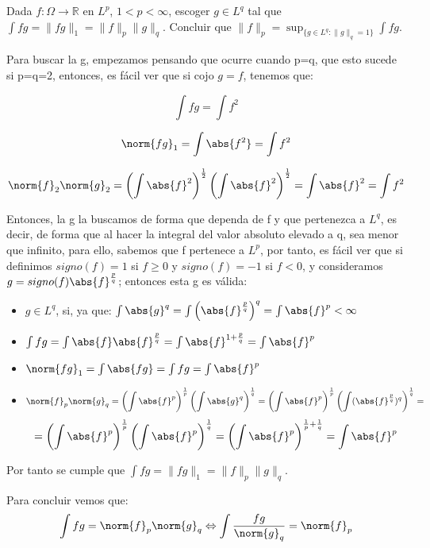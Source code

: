
\begin{problem}[4] Dada $f:\Omega\to \mathbb{R}$ en $L^p$,  $1 < p <  \infty$, escoger $g\in L^q$ tal que
$\int fg = \|fg\|_1 = \|f\|_p\|g\|_q$. Concluir que 
$\|f\|_p= \operatorname{sup}_{\{g\in L^q: \|g\|_q=1\}} \int fg $.
\solution

Para buscar la g, empezamos pensando que ocurre cuando p=q, que esto sucede si p=q=2, entonces, es fácil ver que si cojo $g=f$, tenemos que:

\[
\int fg = \int f^2
\]

\[
\norm{fg}_1 = \int \abs{f^2} = \int f^2
\]

\[
\norm{f}_2 \norm{g}_2 = \left( \int \abs{f}^2 \right)^{\frac{1}{2}} \left( \int \abs{f}^2 \right)^{\frac{1}{2}} =  \int \abs{f}^2 = \int f^2
\]

Entonces, la g la buscamos de forma que dependa de f y  que pertenezca a $L^q$, es decir, de forma que al hacer la integral del valor absoluto elevado a q, sea menor que infinito, para ello, sabemos que f pertenece a $L^p$, por tanto, es fácil ver que si definimos $signo(f)=1$ si $f\geq0$ y $signo(f)=-1$ si $f<0$, y consideramos $g=signo(f)\abs{f}^\frac{p}{q}$; entonces esta g es válida:

\begin{itemize}
\item $g \in L^q$, si, ya que: $\int \abs{g}^q = \int\left( \abs{f}^{\frac{p}{q}}\right)^q = \int \abs{f}^p < \infty$
\item $\int fg = \int \abs{f} \abs{f}^{\frac{p}{q}} = \int \abs{f}^{1+\frac{p}{q}} = \int \abs{f}^p$
\item $\norm{fg}_1 = \int \abs{fg} = \int fg = \int \abs{f}^p$
\item $$\norm{f}_p\norm{g}_q = \left( \int \abs{f}^p \right)^\frac{1}{p} \left( \int \abs{g}^q \right)^\frac{1}{q} = \left( \int \abs{f}^p \right)^\frac{1}{p} \left( \int (\abs{f}^\frac{p}{q})^q \right)^\frac{1}{q} = $$
$$= \left( \int \abs{f}^p \right)^\frac{1}{p} \left( \int \abs{f}^p \right)^\frac{1}{q} = \left( \int \abs{f}^{p}\right)^{\frac{1}{p}+\frac{1}{q}} = \int \abs{f}^p$$
\end{itemize}

Por tanto se cumple que $\int fg = \|fg\|_1 = \|f\|_p\|g\|_q$.

Para concluir vemos que:
\[
\int fg = \norm{f}_p \norm{g}_q  \Leftrightarrow \int \frac{fg}{\norm{g}_q} = \norm{f}_p 
\]


\end{problem}
